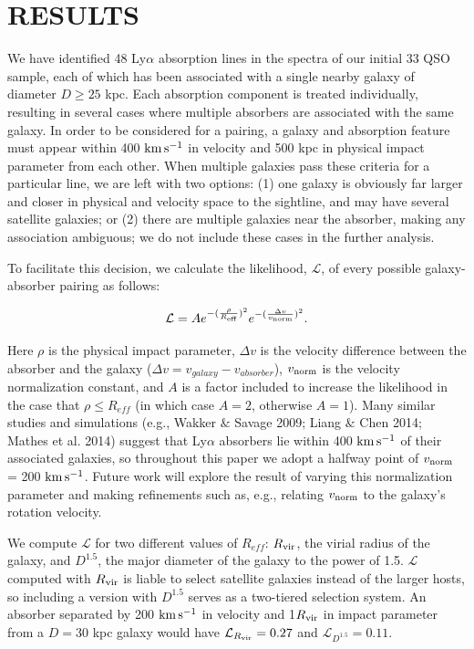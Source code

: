 \section{RESULTS}

We have identified 48 Ly$\alpha$ absorption lines in the spectra of our initial 33 QSO sample, each of which has been associated with a single nearby galaxy of diameter $D\geq25$ kpc. Each absorption component is treated individually, resulting in several cases where multiple absorbers are associated with the same galaxy. In order to be considered for a pairing, a galaxy and absorption feature must appear within 400 $\rm km\, s^{-1}$ in velocity and 500 kpc in physical impact parameter from each other. When multiple galaxies pass these criteria for a particular line, we are left with two options: (1) one galaxy is obviously far larger and closer in physical and velocity space to the sightline, and may have several satellite galaxies; or (2) there are multiple galaxies near the absorber, making any association ambiguous; we do not include these cases in the further analysis.

To facilitate this decision, we calculate the likelihood, $\mathcal{L}$, of every possible galaxy-absorber pairing as follows:

\begin{equation}
	\mathcal{L} = A e^{-(\frac{\rho}{R_{\rm eff}})^2} e^{-(\frac{\Delta v}{v_{\rm norm}})^2}.
\end{equation}

\noindent Here $\rho$ is the physical impact parameter, $\Delta v$ is the velocity difference between the absorber and the galaxy ($\Delta v = v_{galaxy} - v_{absorber}$), $v_{\rm norm}$ is the velocity normalization constant, and $A$ is a factor included to increase the likelihood in the case that $\rho \leq R_{eff}$ (in which case $A = 2$, otherwise $A = 1$). Many similar studies and simulations (e.g., Wakker $\&$ Savage 2009; Liang $\&$ Chen 2014; Mathes et al. 2014) suggest that Ly$\alpha$ absorbers lie within 400 $\rm km\, s^{-1}$ of their associated galaxies, so throughout this paper we adopt a halfway point of $v_{\rm norm}$ = 200 $\rm km\, s^{-1}$. Future work will explore the result of varying this normalization parameter and making refinements such as, e.g., relating $v_{\rm norm}$ to the galaxy's rotation velocity.

We compute $\mathcal{L}$ for two different values of $R_{eff}$: $R_{\rm vir}$, the virial radius of the galaxy, and $D^{1.5}$, the major diameter of the galaxy to the power of 1.5. $\mathcal{L}$ computed with $R_{\rm vir}$ is liable to select satellite galaxies instead of the larger hosts, so including a version with $D^{1.5}$ serves as a two-tiered selection system. An absorber separated by 200 $\rm km\, s^{-1}$ in velocity and 1$R_{\rm vir}$ in impact parameter from a $D=30$ kpc galaxy would have $\mathcal{L}_{R_{\rm vir}} = 0.27$ and $\mathcal{L}_{D^{1.5}} = 0.11$.

